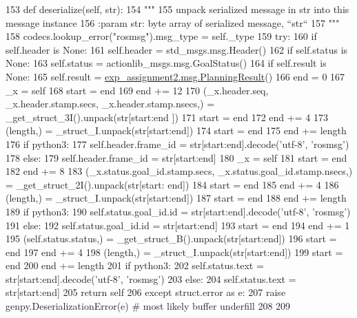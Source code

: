 \begin{DoxyCode}
153   \textcolor{keyword}{def }deserialize(self, str):
154     \textcolor{stringliteral}{"""}
155 \textcolor{stringliteral}{    unpack serialized message in str into this message instance}
156 \textcolor{stringliteral}{    :param str: byte array of serialized message, ``str``}
157 \textcolor{stringliteral}{    """}
158     codecs.lookup\_error(\textcolor{stringliteral}{"rosmsg"}).msg\_type = self.\_type
159     \textcolor{keywordflow}{try}:
160       \textcolor{keywordflow}{if} self.header \textcolor{keywordflow}{is} \textcolor{keywordtype}{None}:
161         self.header = std\_msgs.msg.Header()
162       \textcolor{keywordflow}{if} self.status \textcolor{keywordflow}{is} \textcolor{keywordtype}{None}:
163         self.status = actionlib\_msgs.msg.GoalStatus()
164       \textcolor{keywordflow}{if} self.result \textcolor{keywordflow}{is} \textcolor{keywordtype}{None}:
165         self.result = \hyperlink{classexp__assignment2_1_1msg_1_1__PlanningResult_1_1PlanningResult}{exp\_assignment2.msg.PlanningResult}()
166       end = 0
167       \_x = self
168       start = end
169       end += 12
170       (\_x.header.seq, \_x.header.stamp.secs, \_x.header.stamp.nsecs,) = \_get\_struct\_3I().unpack(str[start:end
      ])
171       start = end
172       end += 4
173       (length,) = \_struct\_I.unpack(str[start:end])
174       start = end
175       end += length
176       \textcolor{keywordflow}{if} python3:
177         self.header.frame\_id = str[start:end].decode(\textcolor{stringliteral}{'utf-8'}, \textcolor{stringliteral}{'rosmsg'})
178       \textcolor{keywordflow}{else}:
179         self.header.frame\_id = str[start:end]
180       \_x = self
181       start = end
182       end += 8
183       (\_x.status.goal\_id.stamp.secs, \_x.status.goal\_id.stamp.nsecs,) = \_get\_struct\_2I().unpack(str[start:
      end])
184       start = end
185       end += 4
186       (length,) = \_struct\_I.unpack(str[start:end])
187       start = end
188       end += length
189       \textcolor{keywordflow}{if} python3:
190         self.status.goal\_id.id = str[start:end].decode(\textcolor{stringliteral}{'utf-8'}, \textcolor{stringliteral}{'rosmsg'})
191       \textcolor{keywordflow}{else}:
192         self.status.goal\_id.id = str[start:end]
193       start = end
194       end += 1
195       (self.status.status,) = \_get\_struct\_B().unpack(str[start:end])
196       start = end
197       end += 4
198       (length,) = \_struct\_I.unpack(str[start:end])
199       start = end
200       end += length
201       \textcolor{keywordflow}{if} python3:
202         self.status.text = str[start:end].decode(\textcolor{stringliteral}{'utf-8'}, \textcolor{stringliteral}{'rosmsg'})
203       \textcolor{keywordflow}{else}:
204         self.status.text = str[start:end]
205       \textcolor{keywordflow}{return} self
206     \textcolor{keywordflow}{except} struct.error \textcolor{keyword}{as} e:
207       \textcolor{keywordflow}{raise} genpy.DeserializationError(e)  \textcolor{comment}{# most likely buffer underfill}
208 
209 
\end{DoxyCode}
